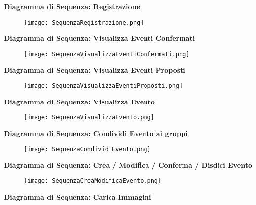 \textbf{Diagramma di Sequenza: Registrazione}

\begin{figure}[h!]
    \begin{center}
        \texttt{[image: SequenzaRegistrazione.png]}
    \end{center}
\end{figure}
\hfill \break
\newpage

\textbf{Diagramma di Sequenza: Visualizza Eventi Confermati}

\begin{figure}[h!]
    \begin{center}
        \texttt{[image: SequenzaVisualizzaEventiConfermati.png]}
    \end{center}
\end{figure}
\hfill \break

\textbf{Diagramma di Sequenza: Visualizza Eventi Proposti}

\begin{figure}[h!]
    \begin{center}
        \texttt{[image: SequenzaVisualizzaEventiProposti.png]}
    \end{center}
\end{figure}
\hfill \break
\newpage
\textbf{Diagramma di Sequenza: Visualizza Evento}

\begin{figure}[h!]
    \begin{center}
        \texttt{[image: SequenzaVisualizzaEvento.png]}
    \end{center}
\end{figure}
\hfill \break
\textbf{Diagramma di Sequenza: Condividi Evento ai gruppi}

\begin{figure}[h!]
    \begin{center}
        \texttt{[image: SequenzaCondividiEvento.png]}
    \end{center}
\end{figure}
\hfill \break
\clearpage

\textbf{Diagramma di Sequenza: Crea / Modifica / Conferma / Disdici Evento}

\begin{figure}[h!]
    \begin{center}
        \texttt{[image: SequenzaCreaModificaEvento.png]}
    \end{center}
\end{figure}
\hfill \break
\clearpage
\textbf{Diagramma di Sequenza: Carica Immagini}

